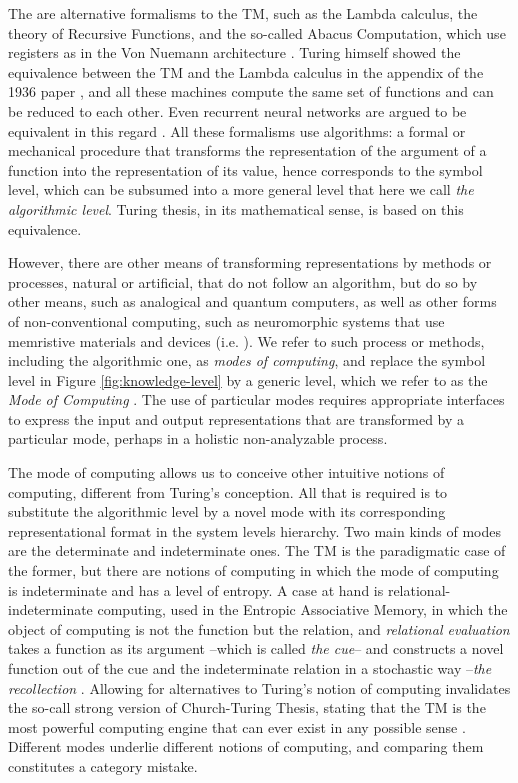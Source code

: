\documentclass[11pt]{article}
\begin{document}
The are alternative formalisms to the TM, such as the Lambda calculus, the theory of Recursive Functions, and the so-called Abacus Computation, which use registers as in the Von Nuemann architecture \cite{boolos-jeffrey-1989}. Turing himself showed the equivalence between the TM and the Lambda calculus in the appendix of the 1936 paper \cite{turing-1936}, and all these machines compute the same set of functions and can be reduced to each other. Even recurrent neural networks are argued to be equivalent in this regard \cite{Sun}. All these formalisms use algorithms: a formal or mechanical procedure that transforms the representation of the argument of a function into the representation of its value, hence corresponds to the symbol level, which can be subsumed into a more general level that here we call \emph{the algorithmic level}. Turing thesis, in its mathematical sense, is based on this equivalence.

However, there are other means of transforming representations by methods or processes, natural or artificial, that do not follow an algorithm, but do so by other means, such as analogical and quantum computers, as well as other forms of non-conventional computing, such as neuromorphic systems that use memristive materials and devices (i.e. \cite{Ziegler2020}). We refer to such process or methods, including the algorithmic one, as \emph{modes of computing}, and replace the symbol level in Figure \ref{fig:knowledge-level} by a generic level, which we refer to as the \emph{Mode of Computing} \cite{Pineda-2024}. The use of particular modes requires appropriate interfaces to express the input and output representations that are transformed by a particular mode, perhaps in a holistic non-analyzable process.

The mode of computing allows us to conceive other intuitive notions of computing, different from Turing's conception. All that is required is to substitute the algorithmic level by a novel mode with its corresponding representational format in the system levels hierarchy. Two main kinds of modes are the determinate and indeterminate ones. The TM is the paradigmatic case of the former, but there are notions of computing in which the mode of computing is indeterminate and has a level of entropy. A case at hand is relational-indeterminate computing, used in the Entropic Associative Memory, in which the object of computing is not the function but the relation, and \emph{relational evaluation} takes a function as its argument --which is called \emph{the cue}-- and constructs a novel function out of the cue and the indeterminate relation in a stochastic way --\emph{the recollection} \cite{pineda-eam-2021,pineda-weam-2022,pineda-imagery-eam-2023,morales2024entropicheteroassociativememory}. Allowing for alternatives to Turing's notion of computing invalidates the so-call strong version of Church-Turing Thesis, stating that the TM is the most powerful computing engine that can ever exist in any possible sense \cite{cop-church-turing}. Different modes underlie different notions of computing, and comparing them constitutes a category mistake.
\end{document}
